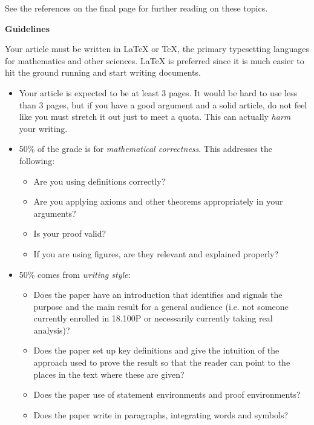 \documentclass{article}
\begin{document}
    See the references on the final page for further reading on these topics.
    \par\hfill\par
    \textbf{\Large{Guidelines}}
    \par\hfill\par
    Your article must be written in \LaTeX{} or \TeX, the primary typesetting
    languages for mathematics and other sciences. \LaTeX{} is preferred since it
    is much easier to hit the ground running and start writing documents.
    \begin{itemize}
        \item
            Your article is expected to be at least 3 pages.
            It would be hard to use less than 3 pages, but if you have
            a good argument and a solid article, do not feel like you
            must stretch it out just to meet a quota. This can actually
            \textit{harm} your writing.
        \item
            50\% of the grade is for \textit{mathematical correctness}.
            This addresses the following:
            \begin{itemize}
                \item
                    Are you using definitions correctly?
                \item
                    Are you applying axioms and other theorems
                    appropriately in your arguments?
                \item
                    Is your proof valid?
                \item
                    If you are using figures, are they relevant and explained
                    properly?
            \end{itemize}
        \item
            50\% comes from \textit{writing style}:
            \begin{itemize}
                \item
                     Does the paper have an introduction that identifies
                     and signals the purpose and the main result for a
                     general audience (i.e. not someone currently enrolled
                     in 18.100P or necessarily currently taking real analysis)?
                \item
                    Does the paper set up key definitions and give the
                    intuition of the approach used to prove the result
                    so that the reader can point to the places in the
                    text where these are given?
                \item
                    Does the paper use of statement environments
                    and proof environments?
                \item
                    Does the paper write in paragraphs,
                    integrating words and symbols?
            \end{itemize}
    \end{itemize}
\end{document}
